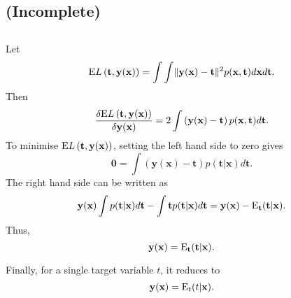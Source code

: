 \subsection{(Incomplete)}
\label{1.24}


\subsection{}
\label{1.25}
Let
%
\begin{equation}
{\rm E} L\left( \mathbf{t}, \mathbf{y} (\mathbf{x}) \right) = \int \int \lVert \mathbf{y}(\mathbf{x}) - \mathbf{t} \rVert ^ 2 p(\mathbf{x}, \mathbf{t}) d\mathbf{x} d\mathbf{t}.
\end{equation}
%
Then
%
\begin{equation}
\frac{\delta {\rm E} L\left( \mathbf{t}, \mathbf{y} (\mathbf{x}) \right)}{\delta \mathbf{y} (\mathbf{x})} = 2 \int \left( \mathbf{y} (\mathbf{x}) - \mathbf{t} \right) p(\mathbf{x}, \mathbf{t}) d\mathbf{t}.
\end{equation}
%
To minimise ${\rm E} L\left( \mathbf{t}, \mathbf{y} (\mathbf{x}) \right)$, setting the left hand side to zero gives
%
\begin{equation}
\mathbf{0} = \int \left( \mathbf{y}(\mathbf{x}) - \mathbf{t} \right) p(\mathbf{t} | \mathbf{x}) d\mathbf{t}.
\end{equation}
%
The right hand side can be written as
%
\begin{equation}
\mathbf{y}(\mathbf{x}) \int p(\mathbf{t} | \mathbf{x}) d\mathbf{t} - \int \mathbf{t} p(\mathbf{t} | \mathbf{x}) d\mathbf{t} = \mathbf{y}(\mathbf{x}) - {\rm E}_\mathbf{t} (\mathbf{t} | \mathbf{x}).
\end{equation}
%
Thus,
%
\begin{equation}
\mathbf{y}(\mathbf{x}) = {\rm E}_\mathbf{t} (\mathbf{t} | \mathbf{x}).
\end{equation}
%

Finally, for a single target variable $t$, it reduces to 
%
\begin{equation}
\mathbf{y}(\mathbf{x}) = {\rm E}_t (t | \mathbf{x}).
\end{equation}
%


